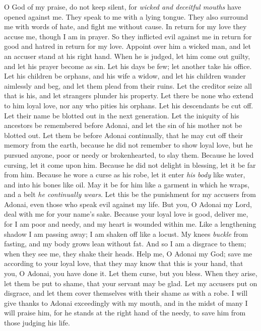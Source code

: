 \begin{biblechapter} %
 O God of my praise, do not keep silent,
\verse for \textit{wicked and deceitful mouths} 
have opened against me. 
They speak to me with a lying tongue.
\verse They also surround me with words of hate, 
and fight me without cause.
\verse In return for my love they accuse me, 
though I am in prayer.
\verse So they inflicted evil against me in return for good 
and hatred in return for my love.
\verse Appoint over him a wicked man, 
and let an accuser stand at his right hand.
\verse When he is judged, let him come out guilty, 
and let his prayer become as sin.
\verse Let his days be few; 
let another take his office.
\verse Let his children be orphans, 
and his wife a widow,
\verse and let his children wander aimlessly and beg, 
and let them plead from their ruins.
\verse Let the creditor seize all that is his, 
and let strangers plunder his property.
\verse Let there be none who extend to him loyal love, 
nor any who pities his orphans.
\verse Let his descendants be cut off. 
Let their name be blotted out in the next generation.
\verse Let the iniquity of his ancestors be remembered before Adonai, 
and let the sin of his mother not be blotted out.
\verse Let them be before Adonai continually, 
that he may cut off their memory from the earth,
\verse because he did not remember to show loyal love, 
but he pursued anyone, poor or needy 
or brokenhearted, to slay them.
\verse Because he loved cursing, let it come upon him. 
Because he did not delight in blessing, 
let it be far from him.
\verse Because he wore a curse as his robe, 
let it enter \textit{his body} like water, 
and into his bones like oil.
\verse May it be for him like a garment in which he wraps, 
and a belt \textit{he continually wears}.
\verse Let this be the punishment for my accusers from Adonai, 
even those who speak evil against my life.
\verse But you, O Adonai my Lord, 
deal with me for your name’s sake. 
Because your loyal love is good, deliver me,
\verse for I am poor and needy, 
and my heart is wounded within me.
\verse Like a lengthening shadow I am passing away; 
I am shaken off like a locust.
\verse My knees \textit{buckle} from fasting, 
and my body grows lean without fat.
\verse And so I am a disgrace to them; 
when they see me, they shake their heads.
\verse Help me, O Adonai my God; 
save me according to your loyal love,
\verse that they may know that this is your hand, 
that you, O Adonai, you have done it.
\verse Let them curse, but you bless. 
When they arise, let them be put to shame, 
that your servant may be glad.
\verse Let my accusers put on disgrace, 
and let them cover themselves with their shame as with a robe.
\verse I will give thanks to Adonai exceedingly with my mouth, 
and in the midst of many I will praise him,
\verse for he stands at the right hand of the needy, 
to save him from those judging his life.
\end{biblechapter}

